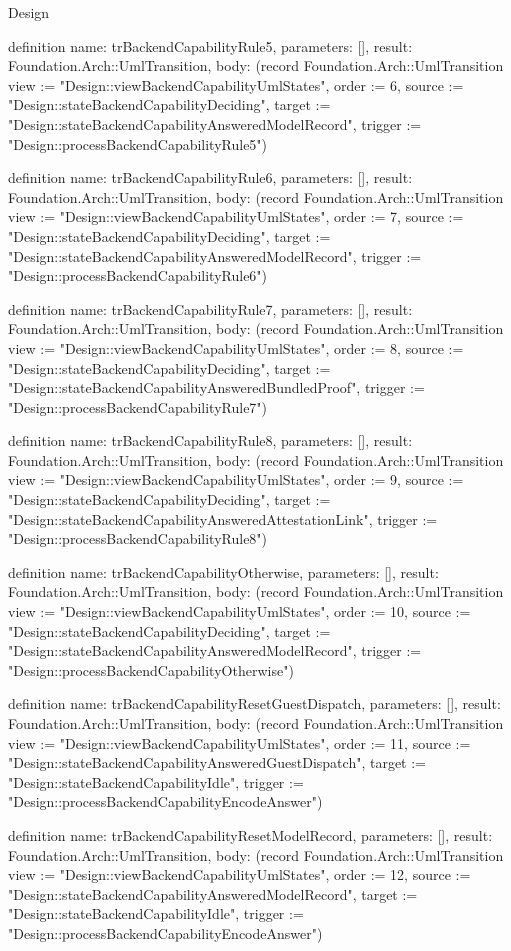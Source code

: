 \begin{lexlean}{Design}
\begin{semanticmodule}
definition{
  name: trBackendCapabilityRule5,
  parameters: [],
  result: Foundation.Arch::UmlTransition,
  body: (record Foundation.Arch::UmlTransition {view := "Design::viewBackendCapabilityUmlStates", order := 6, source := "Design::stateBackendCapabilityDeciding", target := "Design::stateBackendCapabilityAnsweredModelRecord", trigger := "Design::processBackendCapabilityRule5"})
}

definition{
  name: trBackendCapabilityRule6,
  parameters: [],
  result: Foundation.Arch::UmlTransition,
  body: (record Foundation.Arch::UmlTransition {view := "Design::viewBackendCapabilityUmlStates", order := 7, source := "Design::stateBackendCapabilityDeciding", target := "Design::stateBackendCapabilityAnsweredModelRecord", trigger := "Design::processBackendCapabilityRule6"})
}

definition{
  name: trBackendCapabilityRule7,
  parameters: [],
  result: Foundation.Arch::UmlTransition,
  body: (record Foundation.Arch::UmlTransition {view := "Design::viewBackendCapabilityUmlStates", order := 8, source := "Design::stateBackendCapabilityDeciding", target := "Design::stateBackendCapabilityAnsweredBundledProof", trigger := "Design::processBackendCapabilityRule7"})
}

definition{
  name: trBackendCapabilityRule8,
  parameters: [],
  result: Foundation.Arch::UmlTransition,
  body: (record Foundation.Arch::UmlTransition {view := "Design::viewBackendCapabilityUmlStates", order := 9, source := "Design::stateBackendCapabilityDeciding", target := "Design::stateBackendCapabilityAnsweredAttestationLink", trigger := "Design::processBackendCapabilityRule8"})
}

definition{
  name: trBackendCapabilityOtherwise,
  parameters: [],
  result: Foundation.Arch::UmlTransition,
  body: (record Foundation.Arch::UmlTransition {view := "Design::viewBackendCapabilityUmlStates", order := 10, source := "Design::stateBackendCapabilityDeciding", target := "Design::stateBackendCapabilityAnsweredModelRecord", trigger := "Design::processBackendCapabilityOtherwise"})
}

definition{
  name: trBackendCapabilityResetGuestDispatch,
  parameters: [],
  result: Foundation.Arch::UmlTransition,
  body: (record Foundation.Arch::UmlTransition {view := "Design::viewBackendCapabilityUmlStates", order := 11, source := "Design::stateBackendCapabilityAnsweredGuestDispatch", target := "Design::stateBackendCapabilityIdle", trigger := "Design::processBackendCapabilityEncodeAnswer"})
}

definition{
  name: trBackendCapabilityResetModelRecord,
  parameters: [],
  result: Foundation.Arch::UmlTransition,
  body: (record Foundation.Arch::UmlTransition {view := "Design::viewBackendCapabilityUmlStates", order := 12, source := "Design::stateBackendCapabilityAnsweredModelRecord", target := "Design::stateBackendCapabilityIdle", trigger := "Design::processBackendCapabilityEncodeAnswer"})
}


\end{semanticmodule}
\end{lexlean}
